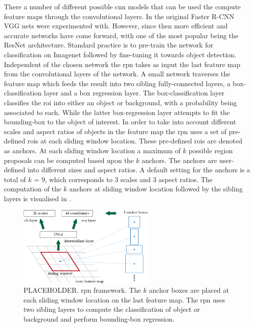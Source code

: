 There a number of different possible \gls{cnn} models that can be used the compute feature maps through the convolutional layers. In the original Faster R-CNN VGG nets \cite{vgg16} were experimented with. However, since then more efficient and accurate networks have come forward, with one of the most popular being the ResNet \cite{deepres} architecture. Standard practice is to pre-train the network for classification on Imagenet followed by fine-tuning it towards object detection. Independent of the chosen network the \gls{rpn} takes as input the last feature map from the convolutional layers of the network. A small network traverses the feature map which feeds the result into two sibling fully-connected layers, a box-classification layer and a box regression layer. The box-classification layer classifies the \gls{roi} into either an object or background, with a probability being associated to each. While the latter box-regression layer attempts to fit the bounding-box to the object of interest. In order to take into account different scales and aspect ratios of objects in the feature map the \gls{rpn} uses a set of pre-defined \glspl{roi} at each sliding window location. These pre-defined \glspl{roi} are denoted as anchors. At each sliding window location a maximum of $k$ possible region proposals can be computed based upon the $k$ anchors. The anchors are user-defined into different sizes and aspect ratios. A default setting for the anchors is a total of $k$ = 9, which corresponds to 3 scales and 3 aspect ratios. The computation of the $k$ anchors at sliding window location followed by the sibling layers is visualised in .

\begin{figure}[H]
  \centering
    \includegraphics[width=0.6\textwidth]{Figs/Techanal/rpnframework.png}
      \caption{PLACEHOLDER. \gls{rpn} framework. The $k$ anchor boxes are placed at each sliding window location on the last feature map. The \gls{rpn} uses two sibling layers to compute the classification of object or background and perform bounding-box regression.}
    \label{fig:rpnframework}
\end{figure}


